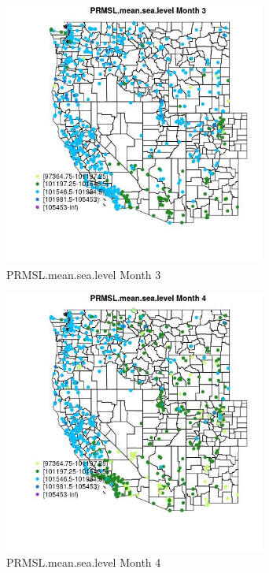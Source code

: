\begin{figure} 
\centering  
\includegraphics[width=0.77\textwidth]{Code_Outputs/Report_ML_input_PM25_Step4_part_e_de_duplicated_aves_compiled_2019-05-21wNAs_MapObsMo3PRMSLmeansealevel.jpg} 
\caption{\label{fig:Report_ML_input_PM25_Step4_part_e_de_duplicated_aves_compiled_2019-05-21wNAsMapObsMo3PRMSLmeansealevel}PRMSL.mean.sea.level Month 3} 
\end{figure} 
 

\clearpage 

\begin{figure} 
\centering  
\includegraphics[width=0.77\textwidth]{Code_Outputs/Report_ML_input_PM25_Step4_part_e_de_duplicated_aves_compiled_2019-05-21wNAs_MapObsMo4PRMSLmeansealevel.jpg} 
\caption{\label{fig:Report_ML_input_PM25_Step4_part_e_de_duplicated_aves_compiled_2019-05-21wNAsMapObsMo4PRMSLmeansealevel}PRMSL.mean.sea.level Month 4} 
\end{figure} 
 

